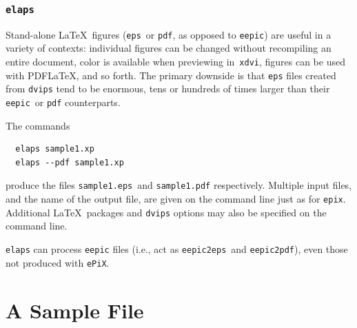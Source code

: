 \documentclass[12pt]{report}
\newcommand{\code}[1]{\texttt{#1}}
\newcommand{\filename}[1]{\texttt{#1}}
\newcommand{\ePiX}{\code{ePiX}}
\begin{document}
\subsubsection*{\code{elaps}}

Stand-alone \LaTeX\ figures (\filename{eps}~or \filename{pdf}, as
opposed to \filename{eepic}) are useful in a variety of contexts:
individual figures can be changed without recompiling an entire
document, color is available when previewing in~\code{xdvi}, figures
can be used with PDF\LaTeX, and so forth. The primary downside is that
\filename{eps} files created from \code{dvips} tend to be enormous,
tens or hundreds of times larger than their \filename{eepic}~or
\code{pdf} counterparts.

The commands
\begin{verbatim}
  elaps sample1.xp
  elaps --pdf sample1.xp
\end{verbatim}
produce the files \filename{sample1.eps}~and \filename{sample1.pdf}
respectively. Multiple input files, and the name of the output file,
are given on the command line just as for \code{epix}. Additional
\LaTeX\ packages and \code{dvips} options may also be specified on the
command line.

\code{elaps} can process \filename{eepic} files (i.e., act as
\code{eepic2eps}~and \code{eepic2pdf}), even those not produced with
\ePiX.

\section{A Sample File}
\end{document}

